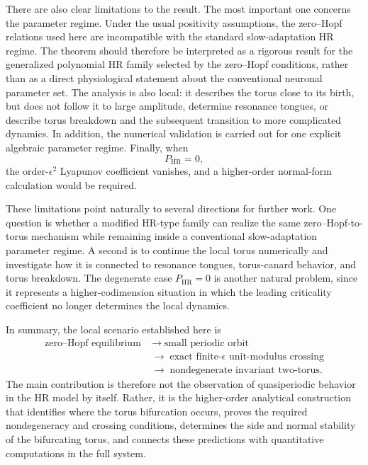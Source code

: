 \documentclass[11pt]{amsart}
\theoremstyle{remark}
\begin{document}
There are also clear limitations to the result. The most important one
concerns the parameter regime. Under the usual positivity assumptions,
the zero--Hopf relations used here are incompatible with the standard
slow-adaptation HR regime. The theorem should therefore be interpreted
as a rigorous result for the generalized polynomial HR family selected
by the zero--Hopf conditions, rather than as a direct physiological
statement about the conventional neuronal parameter set. The analysis
is also local: it describes the torus close to its birth, but does not
follow it to large amplitude, determine resonance tongues, or describe
torus breakdown and the subsequent transition to more complicated
dynamics. In addition, the numerical validation is carried out for one
explicit algebraic parameter regime. Finally, when
\[
P_{\mathrm{HR}}=0,
\]
the order-$\epsilon^2$ Lyapunov coefficient vanishes, and a higher-order
normal-form calculation would be required.

These limitations point naturally to several directions for further
work. One question is whether a modified HR-type family can realize the
same zero--Hopf-to-torus mechanism while remaining inside a conventional
slow-adaptation parameter regime. A second is to continue the local
torus numerically and investigate how it is connected to resonance
tongues, torus-canard behavior, and torus breakdown. The degenerate case
$P_{\mathrm{HR}}=0$ is another natural problem, since it represents a
higher-codimension situation in which the leading criticality
coefficient no longer determines the local dynamics.

In summary, the local scenario established here is
\[
\begin{aligned}
\text{zero--Hopf equilibrium}
&\;\longrightarrow\;
\text{small periodic orbit}\\
&\;\longrightarrow\;
\text{exact finite-$\epsilon$ unit-modulus crossing}\\
&\;\longrightarrow\;
\text{nondegenerate invariant two-torus}.
\end{aligned}
\]
The main contribution is therefore not the observation of
quasiperiodic behavior in the HR model by itself. Rather, it is the
higher-order analytical construction that identifies where the torus
bifurcation occurs, proves the required nondegeneracy and crossing
conditions, determines the side and normal stability of the bifurcating
torus, and connects these predictions with quantitative computations in
the full system.


\appendix
\end{document}
